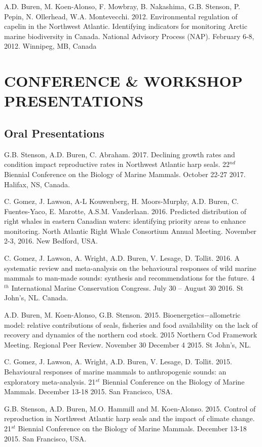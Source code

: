 \documentclass{res}
\begin{document}
\begin{resume}
\begin{hangparas}{.4in}{1}
	A.D. Buren, M. Koen-Alonso, F. Mowbray, B. Nakashima, G.B. Stenson, P. Pepin, N. Ollerhead, W.A. Montevecchi. 2012. Environmental regulation of capelin in the Northwest Atlantic. Identifying indicators for monitoring Arctic marine biodiversity in Canada. National Advisory Process (NAP). February 6-8, 2012. Winnipeg, MB, Canada
\end{hangparas}	

\section{CONFERENCE \& WORKSHOP PRESENTATIONS}
\subsection{Oral Presentations}
\begin{hangparas}{.4in}{1}
G.B. Stenson, A.D. Buren, C. Abraham. 2017. Declining growth rates and condition impact reproductive rates in Northwest Atlantic harp seals. 22$^{nd}$ Biennial Conference on the Biology of Marine Mammals. October 22-27 2017. Halifax, NS, Canada.

C. Gomez,  J. Lawson, A-L Kouwenberg, H. Moors-Murphy, A.D. Buren, C. Fuentes-Yaco, E.  Marotte, A.S.M. Vanderlaan. 2016. Predicted distribution of right whales in eastern Canadian waters: identifying priority areas to enhance monitoring. North Atlantic Right Whale Consortium Annual Meeting. November 2-3, 2016. New Bedford, USA.

C. Gomez, J. Lawson, A. Wright, A.D. Buren, V. Lesage, D. Tollit. 2016. A systematic review and meta-analysis on the behavioural responses of wild marine mammals to man-made sounds: synthesis and recommendations for the future. 4$^{th}$ International Marine Conservation Congress. July 30 – August 30 2016. St John's, NL. Canada.

A.D. Buren, M. Koen-Alonso, G.B. Stenson. 2015. Bioenergetics−allometric model: relative contributions of seals, fisheries and food availability on the lack of recovery and dynamics of the northern cod stock. 2015 Northern Cod Framework Meeting. Regional Peer Review. November 30   December 4 2015. St John's, NL.

C. Gomez, J. Lawson, A. Wright, A.D. Buren, V. Lesage, D. Tollit. 2015. Behavioural responses of marine mammals to anthropogenic sounds: an exploratory meta-analysis. 21$^{st}$ Biennial Conference on the Biology of Marine Mammals. December 13-18 2015. San Francisco, USA.

G.B. Stenson, A.D. Buren, M.O. Hammill and M. Koen-Alonso. 2015. Control of reproduction in Northwest Atlantic harp seals and the impact of climate change. 21$^{st}$ Biennial Conference on the Biology of Marine Mammals. December 13-18 2015. San Francisco, USA.


\end{hangparas}
\end{resume}
\end{document}
